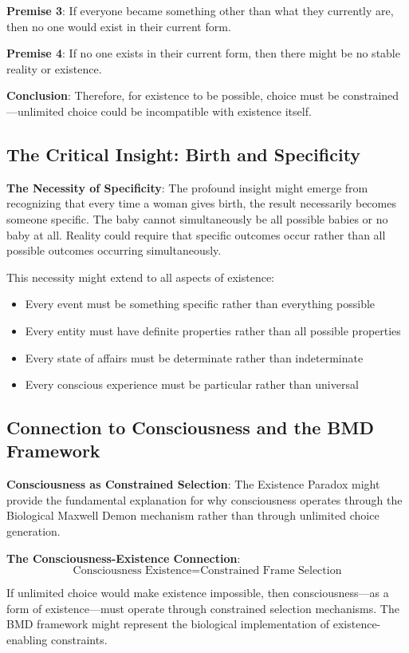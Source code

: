 \documentclass[12pt]{article}
\begin{document}
\textbf{Premise 3}: If everyone became something other than what they currently are, then no one would exist in their current form.

\textbf{Premise 4}: If no one exists in their current form, then there might be no stable reality or existence.

\textbf{Conclusion}: Therefore, for existence to be possible, choice must be constrained—unlimited choice could be incompatible with existence itself.

\subsection{The Critical Insight: Birth and Specificity}

\textbf{The Necessity of Specificity}: The profound insight might emerge from recognizing that every time a woman gives birth, the result necessarily becomes someone specific. The baby cannot simultaneously be all possible babies or no baby at all. Reality could require that specific outcomes occur rather than all possible outcomes occurring simultaneously.

This necessity might extend to all aspects of existence:
\begin{itemize}
\item Every event must be something specific rather than everything possible
\item Every entity must have definite properties rather than all possible properties
\item Every state of affairs must be determinate rather than indeterminate
\item Every conscious experience must be particular rather than universal
\end{itemize}

\subsection{Connection to Consciousness and the BMD Framework}

\textbf{Consciousness as Constrained Selection}: The Existence Paradox might provide the fundamental explanation for why consciousness operates through the Biological Maxwell Demon mechanism rather than through unlimited choice generation.

\textbf{The Consciousness-Existence Connection}:
$$\text{Consciousness Existence} = \text{Constrained Frame Selection}$$

If unlimited choice would make existence impossible, then consciousness—as a form of existence—must operate through constrained selection mechanisms. The BMD framework might represent the biological implementation of existence-enabling constraints.
\end{document}
